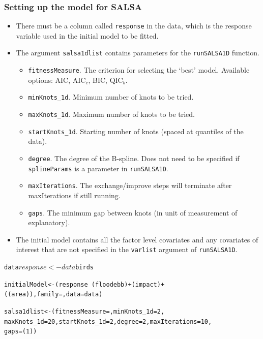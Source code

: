 \begin{frame}[fragile]
\frametitle{Setting up the model for SALSA}
\begin{itemize}
\item There must be a column called {\tt response} in the data, which is the response variable used in the initial model to be fitted.
\item The argument {\tt salsa1dlist} contains parameters for the {\tt runSALSA1D} function.  
\begin{itemize}
\item {\tt fitnessMeasure}. The criterion for selecting the `best' model.  Available options: AIC, AIC$_c$, BIC, QIC$_b$.
\item {\tt minKnots\_1d}. Minimum number of knots to be tried.
\item {\tt maxKnots\_1d}. Maximum number of knots to be tried.
\item {\tt startKnots\_1d}. Starting number of knots (spaced at quantiles of the data).
\item {\tt degree}. The degree of the B-spline. Does not need to be specified if {\tt splineParams} is a parameter in {\tt runSALSA1D}.
\item {\tt maxIterations}. The exchange/improve steps will terminate after maxIterations if still running.
\item {\tt gaps}. The minimum gap between knots (in unit of measurement of explanatory).
\end{itemize}
\item The initial model contains all the factor level covariates and any covariates of interest that are not specified in the {\tt varlist} argument of {\tt runSALSA1D}.
\end{itemize}


\begin{knitrout}\footnotesize
{}\color{fgcolor}\begin{kframe}
\begin{alltt}
data$response <- data$birds

initialModel <- (response ~ (floodebb) + (impact) + 
    ((area)), family = , data = data)


salsa1dlist <- (fitnessMeasure = , minKnots_1d = 2, 
    maxKnots_1d = 20, startKnots_1d = 2, degree = 2, maxIterations = 10, 
    gaps = (1))


\end{alltt}
\end{kframe}
\end{knitrout}
\end{frame}

